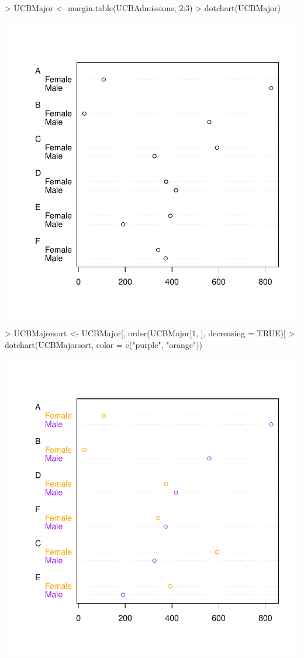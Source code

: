 \documentclass[12pt,letterpaper,final]{article}
\begin{document}
\begin{Schunk}
\begin{Sinput}
> UCBMajor <- margin.table(UCBAdmissions, 2:3)
> dotchart(UCBMajor)
\end{Sinput}
\end{Schunk}
\includegraphics{lect_main-025}

\begin{Schunk}
\begin{Sinput}
> UCBMajorsort <- UCBMajor[, order(UCBMajor[1, ], decreasing = TRUE)]
> dotchart(UCBMajorsort, color = c("purple", "orange"))
\end{Sinput}
\end{Schunk}
\includegraphics{lect_main-026}
\end{document}
